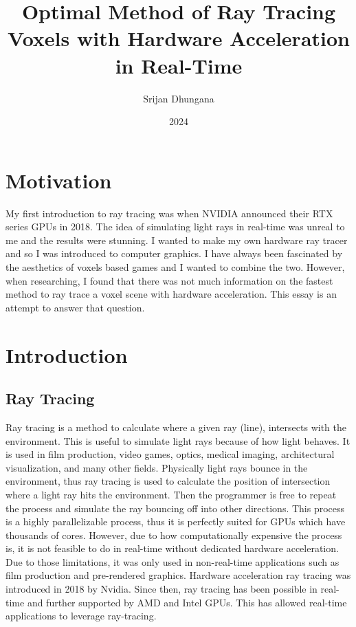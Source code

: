 \documentclass[12pt]{article}
\title{Optimal Method of Ray Tracing Voxels with Hardware Acceleration in Real-Time}
\author{Srijan Dhungana}
\date{2024}
\begin{document}
\maketitle
\clearpage

\tableofcontents
\clearpage


\clearpage

\section{Motivation}

My first introduction to ray tracing was when NVIDIA announced their RTX series GPUs in 2018.
The idea of simulating light rays in real-time was unreal to me and the results were stunning.
I wanted to make my own hardware ray tracer and so I was introduced to computer graphics.
I have always been fascinated by the aesthetics of voxels based games and I wanted to combine the two.
However, when researching, I found that there was not much information on the fastest method to ray trace a voxel scene with hardware acceleration.
This essay is an attempt to answer that question.

\section{Introduction}

\subsection{Ray Tracing}

Ray tracing is a method to calculate where a given ray (line), intersects
with the environment. This is useful to simulate light rays because of how light behaves. It is used in film
production, video games, optics, medical imaging, architectural visualization,
and many other fields. Physically light rays bounce in the environment, thus
ray tracing is used to calculate the position of intersection where a light ray
hits the environment. Then the programmer is free to repeat the process
and simulate the ray bouncing off into other directions. This process is a
highly parallelizable process, thus it is perfectly suited for GPUs which have
thousands of cores. However, due to how computationally expensive the
process is, it is not feasible to do in real-time without dedicated hardware
acceleration. Due to those limitations, it was only used in non-real-time
applications such as film production and pre-rendered graphics. Hardware
acceleration ray tracing was introduced in 2018 by Nvidia. Since then, ray
tracing has been possible in real-time and further supported by AMD and
Intel GPUs. This has allowed real-time applications to leverage ray-tracing.
\end{document}
